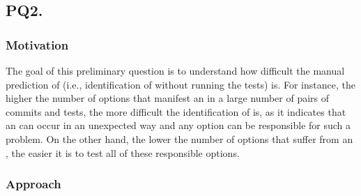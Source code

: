 \subsection*{\textbf{PQ2. \PQII}}

\subsubsection*{Motivation}

The goal of this preliminary question is to understand how difficult the manual prediction of \inconsistent (i.e., identification of \inconsistent without running the tests) is. For instance, the higher the number of options that manifest an \inconsistent in a large number of pairs of commits and tests, the more difficult the identification of \inconsistent is, as it indicates that an \inconsistent can occur in an unexpected way and any option can be responsible for such a problem. On the other hand, the lower the number of options that suffer from an \inconsistent, the easier it is to test all of these \inconsistent responsible options. 

\subsubsection*{Approach}

